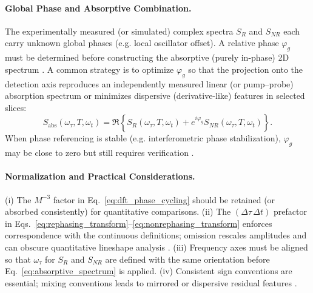 \paragraph{Global Phase and Absorptive Combination.}
\noindent The experimentally measured (or simulated) complex spectra $S_{R}$ and $S_{NR}$ each carry unknown global phases (e.g. local oscillator offset). A relative phase $\varphi_g$ must be determined before constructing the absorptive (purely in-phase) 2D spectrum \cite{Mukamel1995PrinciplesNonlinearOptical, Jonas2003TwodimensionalFemtosecondSpectroscopy, GreenEtAl2024}. A common strategy is to optimize $\varphi_g$ so that the projection onto the detection axis reproduces an independently measured linear (or pump--probe) absorption spectrum or minimizes dispersive (derivative-like) features in selected slices:
\begin{equation}
    S_{\text{abs}}(\omega_\tau, T, \omega_t)
    =
    \Re \left\{
        S_{R}(\omega_\tau, T, \omega_t) + e^{i \varphi_g} S_{NR}(\omega_\tau, T, \omega_t)
    \right\}.
    \label{eq:absorptive_spectrum}
\end{equation}
When phase referencing is stable (e.g. interferometric phase stabilization), $\varphi_g$ may be close to zero but still requires verification \cite{BrixnerEtAl2004PhasestabilizedTwodimensionalElectronic, GreenEtAl2024}.

\paragraph{Normalization and Practical Considerations.}
\noindent (i) The $M^{-3}$ factor in Eq.~\eqref{eq:dft_phase_cycling} should be retained (or absorbed consistently) for quantitative comparisons. (ii) The $(\Delta\tau\,\Delta t)$ prefactor in Eqs.~\eqref{eq:rephasing_transform}--\eqref{eq:nonrephasing_transform} enforces correspondence with the continuous definitions; omission rescales amplitudes and can obscure quantitative lineshape analysis \cite{Cho2009TwodimensionalOpticalSpectroscopy, GreenEtAl2024}. (iii) Frequency axes must be aligned so that $\omega_\tau$ for $S_{R}$ and $S_{NR}$ are defined with the same orientation before Eq.~\eqref{eq:absorptive_spectrum} is applied. (iv) Consistent sign conventions are essential; mixing conventions leads to mirrored or dispersive residual features \cite{Mukamel1995PrinciplesNonlinearOptical, Cho2009TwodimensionalOpticalSpectroscopy, GreenEtAl2024}.

